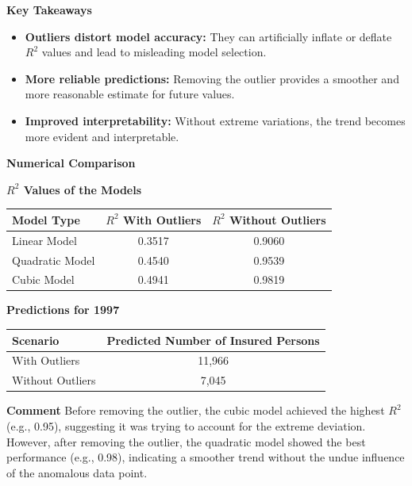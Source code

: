 \documentclass[12pt]{article}
\begin{document}
\textbf{Key Takeaways}

\begin{itemize}
    \item \textbf{Outliers distort model accuracy:} They can artificially inflate or deflate \( R^2 \) values and lead to misleading model selection.
    \item \textbf{More reliable predictions:} Removing the outlier provides a smoother and more reasonable estimate for future values.
    \item \textbf{Improved interpretability:} Without extreme variations, the trend becomes more evident and interpretable.
\end{itemize}

\textbf{Numerical Comparison}

\textbf{\( R^2 \) Values of the Models}

\begin{table}[h!]
    \centering
    \begin{tabular}{lcc}
        \toprule
        \textbf{Model Type} & \textbf{\( R^2 \) With Outliers} & \textbf{\( R^2 \) Without Outliers} \\
        \midrule
        Linear Model & 0.3517 & 0.9060 \\
        Quadratic Model & 0.4540 & 0.9539 \\
        Cubic Model & 0.4941 & 0.9819 \\
        \bottomrule
    \end{tabular}
\end{table}

\textbf{Predictions for 1997}

\begin{table}[h!]
    \centering
    \begin{tabular}{lc}
        \toprule
        \textbf{Scenario} & \textbf{Predicted Number of Insured Persons} \\
        \midrule
        With Outliers & 11,966 \\
        Without Outliers & 7,045 \\
        \bottomrule
    \end{tabular}
\end{table}

\textbf{Comment}
Before removing the outlier, the cubic model achieved the highest \( R^2 \) (e.g., 0.95), suggesting it was trying to account for the extreme deviation. However, after removing the outlier, the quadratic model showed the best performance (e.g., 0.98), indicating a smoother trend without the undue influence of the anomalous data point.
\end{document}
